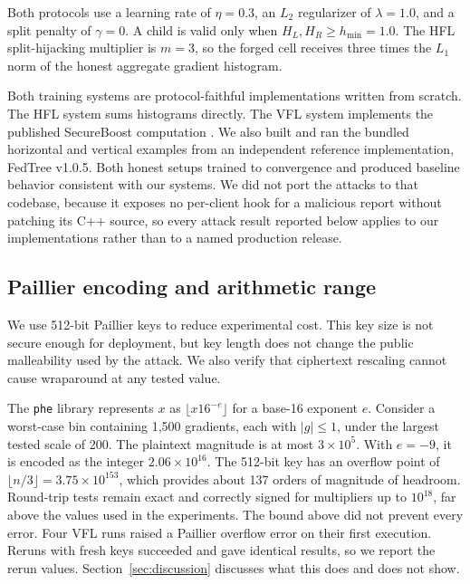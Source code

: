 \documentclass[11pt]{article}
\newcommand{\rev}[1]{{\color{blue}#1}}
\begin{document}
Both protocols use a learning rate of $\eta=0.3$, an $L_2$ regularizer of $\lambda=1.0$, and a split penalty of $\gamma=0$. A child is valid only when $H_L,H_R\geq h_{\min}=1.0$. The HFL split-hijacking multiplier is $m=3$, so the forged cell receives three times the $L_1$ norm of the honest aggregate gradient histogram.

Both training systems are protocol-faithful implementations written from scratch. The HFL system sums histograms directly. The VFL system implements the published SecureBoost computation \cite{cheng2021secureboost}. We also built and ran the bundled horizontal and vertical examples from an independent reference implementation\rev{, FedTree v1.0.5}. Both honest setups trained to convergence and produced baseline behavior consistent with our systems. We did not port the attacks to that codebase\rev{, because it exposes no per-client hook for a malicious report without patching its C++ source}, so every attack result reported below applies to our implementations rather than to a named production release.

\subsection{Paillier encoding and arithmetic range}

We use 512-bit Paillier keys to reduce experimental cost. This key size is not secure enough for deployment, but key length does not change the public malleability used by the attack. We also verify that ciphertext rescaling cannot cause wraparound at any tested value.

The \texttt{phe} library represents $x$ as $\lfloor x16^{-e}\rfloor$ for a base-16 exponent $e$. Consider a worst-case bin containing 1,500 gradients, each with $\lvert g\rvert\leq1$, under the largest tested scale of 200. The plaintext magnitude is at most $3\times10^5$. With $e=-9$, it is encoded as the integer $2.06\times10^{16}$. The 512-bit key has an overflow point of $\lfloor n/3\rfloor=3.75\times10^{153}$, which provides about 137 orders of magnitude of headroom. Round-trip tests remain exact and correctly signed for multipliers up to $10^{18}$, far above the values used in the experiments. \rev{The bound above did not prevent every error. Four VFL runs raised a Paillier overflow error on their first execution. Reruns with fresh keys succeeded and gave identical results, so we report the rerun values. Section~\ref{sec:discussion} discusses what this does and does not show.}
\end{document}
